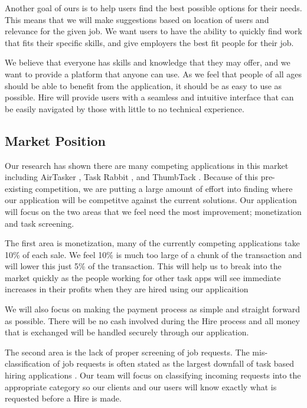 \documentclass[11pt]{article}
\begin{document}
Another goal of ours is to help users find the best possible options for their needs. This means that we will make suggestions based on location of users and relevance for the given job. We want users to have the ability to quickly find work that fits their specific skills, and give employers the best fit people for their job.

We believe that everyone has skills and knowledge that they may offer, and we want to provide a platform that anyone can use. As we feel that people of all ages should be able to benefit from the application, it should be as easy to use as possible. Hire will provide users with a seamless and intuitive interface that can be easily navigated by those with little to no technical experience.

\subsection{Market Position}

Our research has shown there are many competing applications in this market including AirTasker \cite{AirTasker}, Task Rabbit \cite{TaskRabbit}, and ThumbTack \cite{ThumbTack}. 
Because of this pre-existing competition, we are putting a large amount of effort into finding where our application will be competitve against the current solutions. 
Our application will focus on the two areas that we feel need the most improvement; monetization and task screening.

The first area is monetization, many of the currently competing applications take 10\% of each sale. 
We feel 10\% is much too large of a chunk of the transaction and will lower this just 5\% of the transaction. 
This will help us to break into the market quickly as the people working for other task apps will see immediate increases in their profits when they are hired using our applicaition

We will also focus on making the payment process as simple and straight forward as possible. 
There will be no cash involved during the Hire process and all money that is exchanged will be handled securely through our application.

The second area is the lack of proper screening of job requests. 
The mis-classification of job requests is often stated as the largest downfall of task based hiring applications \cite{ThumbTack_sucks}. 
Our team will focus on classifying incoming requests into the appropriate category so our clients and our users will know exactly what is requested before a Hire is made.
\end{document}
